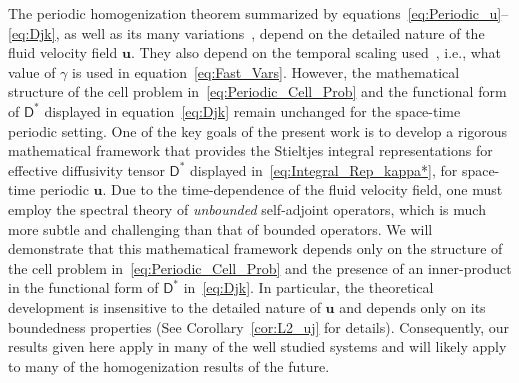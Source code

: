 \documentclass[leqno,onefignum,onetabnum]{siamltex1213}
\newcommand{\corref}[1]{Corollary~\ref{#1}}
\newcommand{\Dm}{\mathsf{D}}
\newcommand{\vecu}{\boldsymbol{u}}
\begin{document}
The periodic homogenization theorem summarized by
equations~\eqref{eq:Periodic_u}--\eqref{eq:Djk}, as well as its many
variations~\cite{Bensoussan:Book:1978,Papanicolaou:1981:36:8,Bhattacharya:1985:AnnProb:13:2:385,Bhattacharya:1989:ASD,McLaughlin:SIAM_JAM:780,Avellaneda:CMP-339,Pavliotis:PHD_Thesis,Pavliotis:IMAJAM:951,Pavliotis:CMS:2007:507,McLaughlin:Forest:PF:1999:880,Majda:Kramer:1999:book}, 
depend on the detailed nature of the fluid velocity field
$\vecu$. They also depend on the temporal scaling
used~\cite{Bhattacharya:1989:ASD,Pavliotis:PHD_Thesis,Majda:Kramer:1999:book},
i.e., what value of $\gamma$ is used in
equation~\eqref{eq:Fast_Vars}. However, the mathematical structure of
the cell problem in~\eqref{eq:Periodic_Cell_Prob} and the functional
form of $\Dm^*$ displayed in equation~\eqref{eq:Djk} remain
unchanged for the space-time periodic setting. One of the key goals of
the present work is to develop a rigorous mathematical framework that
provides the Stieltjes integral representations for effective diffusivity
tensor $\Dm^*$ displayed in~\eqref{eq:Integral_Rep_kappa*}, for
space-time periodic $\vecu$. Due to the time-dependence of the fluid
velocity field, one must employ the spectral theory of
\emph{unbounded} self-adjoint operators, which is much more
subtle and challenging than that of bounded operators. We will
demonstrate that this mathematical framework depends only on the
structure of the cell problem in~\eqref{eq:Periodic_Cell_Prob} and the
presence of an inner-product in the functional form of $\Dm^*$
in~\eqref{eq:Djk}. In particular, the theoretical development is 
insensitive to the detailed nature of $\vecu$ and depends only
on its boundedness properties (See \corref{cor:L2_uj} for
details). Consequently, our results given here apply in many of the
well studied systems and will likely apply to many of the
homogenization results of the future.          
\end{document}
